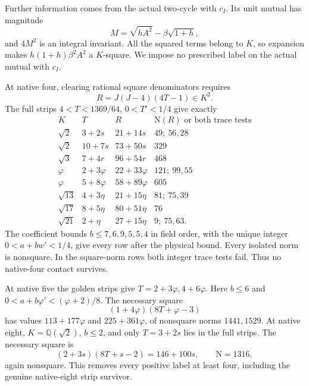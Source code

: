 \documentclass[11pt]{article}
\begin{document}
Further information comes from the
actual two-cycle with \(c_I\).
Its unit mutual has magnitude
\[
                 M=\sqrt{hA^2}-\beta\sqrt{1+h},
\]
and \(4M^2\) is an integral invariant.
All the squared terms belong to \(K\),
so expansion makes
\(h(1+h)\beta^2A^2\) a \(K\)-square.
We impose no prescribed label on
the actual mutual with \(c_I\).

At native four, clearing rational
square denominators requires
\[
                         R=J(J-4)(4T-1)\in K^2 .
\]
The full strips
\(4<T<1369/64\), \(0<T'<1/4\)
give exactly
\[
\begin{array}{c|c|c|c}
 K&T&R&\mathrm N(R)\text{ or both trace tests}\\ \hline
 \sqrt2&3+2s&21+14s&49;\ 56,28\\
 \sqrt2&10+7s&73+50s&329\\
 \sqrt3&7+4r&96+54r&468\\
 \varphi&2+3\varphi&22+33\varphi&121;\ 99,55\\
 \varphi&5+8\varphi&58+89\varphi&605\\
 \sqrt{13}&4+3\eta&21+15\eta&81;\ 75,39\\
 \sqrt{17}&8+5\eta&80+51\eta&76\\
 \sqrt{21}&2+\eta&27+15\eta&9;\ 75,63 .
\end{array}
\]
The coefficient bounds \(b\le7,6,9,5,5,4\)
in field order, with the unique
integer \(0<a+bw'<1/4\), give every
row after the physical bound.
Every isolated norm is nonsquare.
In the square-norm rows both
integer trace tests fail.
Thus no native-four contact survives.

At native five the golden strips
give \(T=2+3\varphi,4+6\varphi\).
Here \(b\le6\) and
\(0<a+b\varphi'<(\varphi+2)/8\).
The necessary square
\[
                    (1+4\varphi)(8T+\varphi-3)
\]
has values \(113+177\varphi\) and
\(225+361\varphi\), of nonsquare norms
\(1441,1529\).
At native eight, \(K=\mathbb Q(\sqrt2)\),
\(b\le2\), and only \(T=3+2s\)
lies in the full strips.
The necessary square is
\[
              (2+3s)(8T+s-2)=146+100s,
                       \qquad\mathrm N=1316,
\]
again nonsquare.
This removes every positive label
at least four, including the genuine
native-eight strip survivor.
\end{document}
